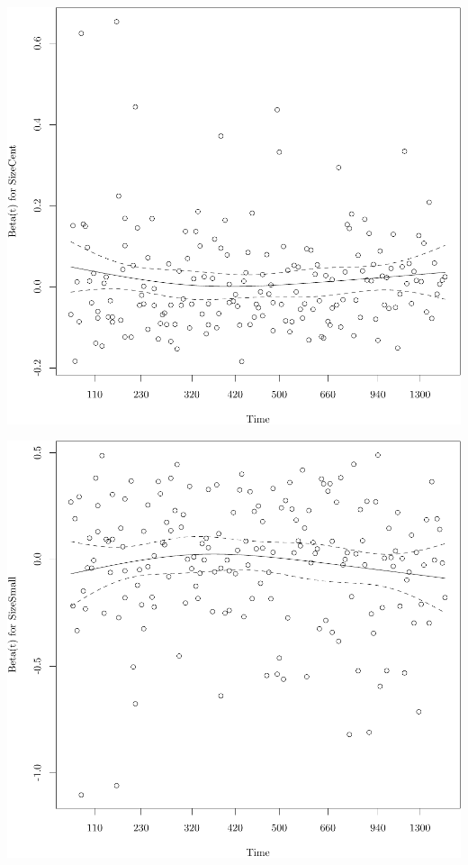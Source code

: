\documentclass{article}\usepackage[]{graphicx}\usepackage[]{color}
\makeatletter
\def\maxwidth{ %
  \ifdim\Gin@nat@width>\linewidth
    \linewidth
  \else
    \Gin@nat@width
  \fi
}
\newenvironment{knitrout}{}{} %
\makeatother
\begin{document}
\begin{knitrout}
{}




{\centering \includegraphics[width=\maxwidth]{figure/05-eda-ph-check-full-3-4} 

}




{\centering \includegraphics[width=\maxwidth]{figure/05-eda-ph-check-full-3-5} 

}
\end{knitrout}
\end{document}
